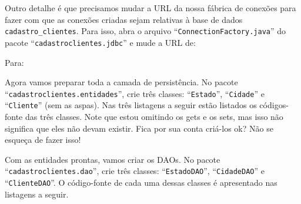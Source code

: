 Outro detalhe é que precisamos mudar a URL da nossa fábrica de conexões para fazer com que as conexões criadas sejam relativas à base de dados \texttt{cadastro\_clientes}. Para isso, abra o arquivo ``\texttt{ConnectionFactory.java}'' do pacote\linebreak%
``\texttt{cadastroclientes.jdbc}'' e mude a URL de:


Para:


Agora vamos preparar toda a camada de persistência. No pacote\linebreak%
``\texttt{cadastroclientes.entidades}'', crie três classes: ``\texttt{Estado}'', ``\texttt{Cidade}'' e ``\texttt{Cliente}'' (sem as aspas). Nas três listagens a seguir estão listados os códigos-fonte das três classes. Note que estou omitindo os gets e os sets, mas isso não significa que eles não devam existir. Fica por sua conta criá-los ok? Não se esqueça de fazer isso!




Com as entidades prontas, vamos criar os DAOs. No pacote ``\texttt{cadastroclientes.dao}'', crie três classes: ``\texttt{EstadoDAO}'', ``\texttt{CidadeDAO}'' e ``\texttt{ClienteDAO}''. O código-fonte de cada uma dessas classes é apresentado nas listagens a seguir.



